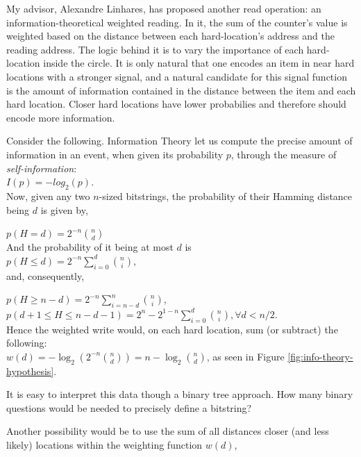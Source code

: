 My advisor, Alexandre Linhares, has proposed another read operation: an information-theoretical weighted reading. In it, the sum of the counter's value is weighted based on the distance between each hard-location's address and the reading address. The logic behind it is to vary the importance of each hard-location inside the circle.  It is only natural that one encodes an item in near hard locations with a stronger signal, and a natural candidate for this signal function is the amount of information contained in the distance between the item and each hard location.  Closer hard locations have lower probabilies and therefore should encode more information.

Consider the following. Information Theory \citep{cover2012elements} let us compute the precise amount of information in an event, when given its probability $p$, through the measure of \emph{self-information}:\\

$I(p)= -log_2(p).$ \\

Now, given any two $n$-sized bitstrings, the probability of their Hamming distance being $d$ is given by,


$p(H=d)= {2^{-n} \binom{n}{d} }$ \\

And the probability of it being at most $d$ is \\

$p(H\leq d)= 2^{-n} {\displaystyle\sum_{i=0}^{d}{\binom{n}{i}}}  $, \\

and, consequently,

$p(H\geq n-d)=2^{-n}{\displaystyle\sum_{i=n-d}^{n}{\binom{n}{i}}  }$, \\

$p(d+1 \leq H \leq n-d-1)=2^n - 2^{1-n}{\displaystyle\sum_{i=0}^{d}{\binom{n}{i}}, \forall d<n/2}$. \\

Hence the weighted write would, on each hard location, sum (or subtract) the following:  \\

$w(d) = -\log_2 \left( 2^{-n} \binom{n}{d} \right) = n - \log_2 \binom{n}{d}$, as seen in Figure \ref{fig:info-theory-hypothesis}.

It is easy to interpret this data though a binary tree approach.  How many binary questions would be needed to precisely define a bitstring?

Another possibility would be to use the sum of all distances closer (and less likely) locations within the weighting function $w(d)$,

